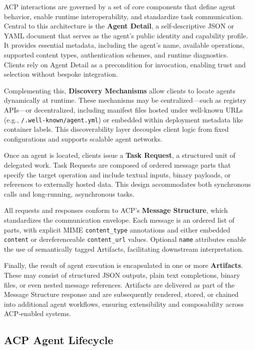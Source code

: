 \documentclass{article}
\begin{document}
ACP interactions are governed by a set of core components that define agent behavior, enable runtime interoperability, and standardize task communication. Central to this architecture is the \textbf{Agent Detail}, a self-descriptive JSON or YAML document that serves as the agent’s public identity and capability profile. It provides essential metadata, including the agent’s name, available operations, supported content types, authentication schemes, and runtime diagnostics. Clients rely on Agent Detail as a precondition for invocation, enabling trust and selection without bespoke integration.

Complementing this, \textbf{Discovery Mechanisms} allow clients to locate agents dynamically at runtime. These mechanisms may be centralized—such as registry APIs—or decentralized, including manifest files hosted under well-known URLs (e.g., \texttt{/.well-known/agent.yml}) or embedded within deployment metadata like container labels. This discoverability layer decouples client logic from fixed configurations and supports scalable agent networks.

Once an agent is located, clients issue a \textbf{Task Request}, a structured unit of delegated work. Task Requests are composed of ordered message parts that specify the target operation and include textual inputs, binary payloads, or references to externally hosted data. This design accommodates both synchronous calls and long-running, asynchronous tasks.

All requests and responses conform to ACP’s \textbf{Message Structure}, which standardizes the communication envelope. Each message is an ordered list of parts, with explicit MIME \texttt{content\_type} annotations and either embedded \texttt{content} or dereferenceable \texttt{content\_url} values. Optional \texttt{name} attributes enable the use of semantically tagged Artifacts, facilitating downstream interpretation.

Finally, the result of agent execution is encapsulated in one or more \textbf{Artifacts}. These may consist of structured JSON outputs, plain text completions, binary files, or even nested message references. Artifacts are delivered as part of the Message Structure response and are subsequently rendered, stored, or chained into additional agent workflows, ensuring extensibility and composability across ACP-enabled systems.


\subsection{ACP Agent Lifecycle}
\end{document}

